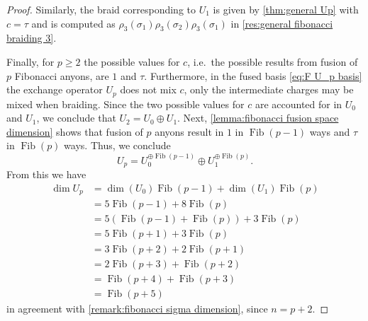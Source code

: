 \documentclass[a4paper,10pt,oneside]{book}
\theoremstyle{plain}
\theoremstyle{definition}
\theoremstyle{remark}
\DeclareMathOperator{\Fib}{Fib}
\begin{document}
\begin{proof}
  Similarly, the braid corresponding to $U_1$ is given by \cref{thm:general Up} with $c=τ$ and is computed as $ρ_3(σ_1) ρ_3(σ_2) ρ_3(σ_1)$ in \cref{res:general fibonacci braiding 3}.

  Finally, for $p \ge 2$ the possible values for $c$, i.e.\ the possible results from fusion of $p$ Fibonacci anyons, are $1$ and $τ$. Furthermore, in the fused basis \cref{eq:F U_p basis} the exchange operator $U_p$ does not mix $c$, only the intermediate charges may be mixed when braiding. Since the two possible values for $c$ are accounted for in $U_0$ and $U_1$, we conclude that $U_2 = U_0 \oplus U_1$. Next, \cref{lemma:fibonacci fusion space dimension} shows that fusion of $p$ anyons result in $1$ in $\Fib(p-1)$ ways and $τ$ in $\Fib(p)$ ways. Thus, we conclude
  \begin{equation}
    U_p = U_0^{\oplus\Fib(p-1)} \oplus U_1^{\oplus\Fib(p)}.
  \end{equation}
  From this we have
  \begin{equation}
    \begin{aligned}
      \dim U_p
      &= \dim(U_0) \Fib(p-1) + \dim(U_1) \Fib(p) \\
      &= 5 \Fib(p-1) + 8 \Fib(p) \\
      &= 5 \left(\Fib(p-1) + \Fib(p) \right) + 3 \Fib(p) \\
      &= 5 \Fib(p+1) + 3 \Fib(p) \\
      &= 3 \Fib(p+2) + 2 \Fib(p+1) \\
      &= 2 \Fib(p+3) + \Fib(p+2) \\
      &=   \Fib(p+4) + \Fib(p+3) \\
      &=   \Fib(p+5)
    \end{aligned}
  \end{equation}
  in agreement with \cref{remark:fibonacci sigma dimension}, since $n = p + 2$.



\end{proof}
\end{document}
